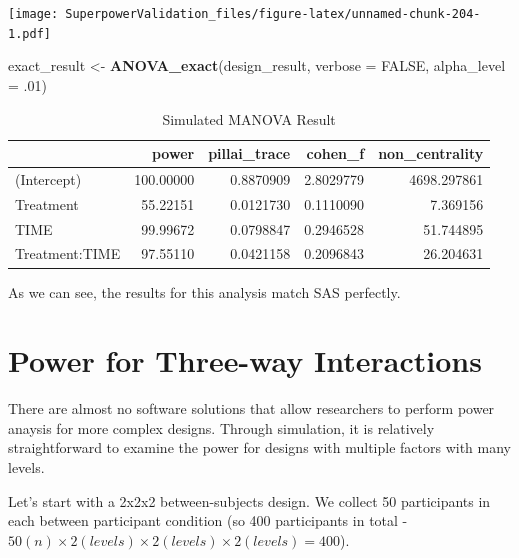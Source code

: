 \documentclass[]{book}
\newenvironment{Shaded}{\begin{snugshade}}{\end{snugshade}}
\newcommand{\DataTypeTok}[1]{\textcolor[rgb]{0.13,0.29,0.53}{#1}}
\newcommand{\FloatTok}[1]{\textcolor[rgb]{0.00,0.00,0.81}{#1}}
\newcommand{\KeywordTok}[1]{\textcolor[rgb]{0.13,0.29,0.53}{\textbf{#1}}}
\newcommand{\NormalTok}[1]{#1}
\newcommand{\OtherTok}[1]{\textcolor[rgb]{0.56,0.35,0.01}{#1}}
\newcommand{\StringTok}[1]{\textcolor[rgb]{0.31,0.60,0.02}{#1}}
\begin{document}
\texttt{[image: SuperpowerValidation\_files/figure-latex/unnamed-chunk-204-1.pdf]}

\begin{Shaded}
\begin{Highlighting}[]
\NormalTok{exact_result <-}\StringTok{ }\KeywordTok{ANOVA_exact}\NormalTok{(design_result, }\DataTypeTok{verbose =} \OtherTok{FALSE}\NormalTok{,}
                            \DataTypeTok{alpha_level =} \FloatTok{.01}\NormalTok{)}
\end{Highlighting}
\end{Shaded}

\begin{table}[!h]

\caption{\label{tab:unnamed-chunk-205}Simulated MANOVA Result}
\centering
\begin{tabular}{l|r|r|r|r}
\hline
  & power & pillai\_trace & cohen\_f & non\_centrality\\
\hline
(Intercept) & 100.00000 & 0.8870909 & 2.8029779 & 4698.297861\\
\hline
Treatment & 55.22151 & 0.0121730 & 0.1110090 & 7.369156\\
\hline
TIME & 99.99672 & 0.0798847 & 0.2946528 & 51.744895\\
\hline
Treatment:TIME & 97.55110 & 0.0421158 & 0.2096843 & 26.204631\\
\hline
\end{tabular}
\end{table}

As we can see, the results for this analysis match SAS perfectly.

\hypertarget{power-for-three-way-interactions}{%
\chapter{Power for Three-way Interactions}\label{power-for-three-way-interactions}}

There are almost no software solutions that allow researchers to perform power anaysis for more complex designs. Through simulation, it is relatively straightforward to examine the power for designs with multiple factors with many levels.

Let's start with a 2x2x2 between-subjects design. We collect 50 participants in each between participant condition (so 400 participants in total - \(50(n)\times2(levels)\times2(levels)\times2(levels)= 400\)).
\end{document}

